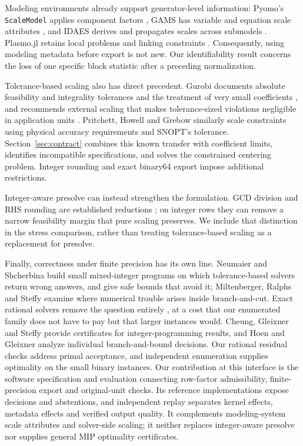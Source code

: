 Modeling environments already support generator-level information: Pyomo's
\texttt{ScaleModel} applies component factors \cite{pyomoScaleModel}, GAMS has
variable and equation scale attributes \cite{gamsScaling}, and IDAES derives and
propagates scales across submodels \cite{idaesScaling,idaesCustomScaler}. Plasmo.jl
retains local problems and linking constraints \cite{jalving2022plasmo}. Consequently,
using modeling metadata before export is not new. Our identifiability result concerns
the loss of one specific block statistic after a preceding normalization.

Tolerance-based scaling also has direct precedent. Gurobi documents absolute
feasibility and integrality tolerances and the treatment of very small coefficients
\cite{gurobiScaling}, and recommends external scaling that makes tolerance-sized
violations negligible in application units \cite{gurobiExternalScaling}. Pritchett,
Howell and Grebow \cite{pritchett2017scaling} similarly scale constraints using
physical accuracy requirements and SNOPT's tolerance. Section~\ref{sec:contract}
combines this known transfer with coefficient limits, identifies incompatible
specifications, and solves the constrained centering problem. Integer rounding and
exact binary64 export impose additional restrictions.

Integer-aware presolve can instead strengthen the formulation. GCD division and
RHS rounding are established reductions \cite{achterberg2020presolve}; on integer
rows they can remove a narrow feasibility margin that pure scaling preserves.
We include that distinction in the stress comparison, rather than treating
tolerance-based scaling as a replacement for presolve.

Finally, correctness under finite precision has its own line. Neumaier and Shcherbina
\cite{neumaier2004safe} build small mixed-integer programs on which tolerance-based solvers
return wrong answers, and give safe bounds that avoid it; Miltenberger, Ralphs and Steffy
\cite{miltenberger2018numerics} examine where numerical trouble arises inside branch-and-cut.
Exact rational solvers remove the question entirely \cite{cook2013exact,eifler2022status}, at a
cost that our enumerated family does not have to pay but that larger instances would. Cheung,
Gleixner and Steffy \cite{cheung2017certificates} provide certificates for
integer-programming results, and Hoen and Gleixner \cite{hoen2024correctness} analyze
individual branch-and-bound decisions. Our rational residual checks address primal acceptance,
and independent enumeration supplies optimality on the small binary instances.
Our contribution at this interface is the software specification and evaluation connecting
row-factor admissibility, finite-precision export and original-unit checks. Its reference
implementations expose decisions and abstentions, and independent replay separates
kernel effects, metadata effects and verified output quality. It complements modeling-system scale attributes and
solver-side scaling; it neither replaces integer-aware presolve nor supplies general MIP
optimality certificates.
